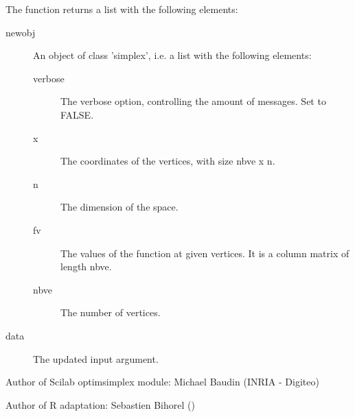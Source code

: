 \begin{Value}
The  function returns a list with the following elements: 
\begin{description}

\item[newobj] An object of class 'simplex', i.e. a list with the following 
elements: \begin{description}

\item[verbose] The verbose option, controlling the amount of messages.
Set to FALSE.
\item[x] The coordinates of the vertices, with size nbve x n.
\item[n] The dimension of the space.
\item[fv] The values of the function at given vertices. It is a column
matrix of length nbve.
\item[nbve] The number of vertices.

\end{description}


\item[data] The updated  input argument.

\end{description}


\end{Value}
%
\begin{Author}\relax
Author of Scilab optimsimplex module: Michael Baudin (INRIA - Digiteo)

Author of R adaptation: Sebastien Bihorel ()
\end{Author}
%

